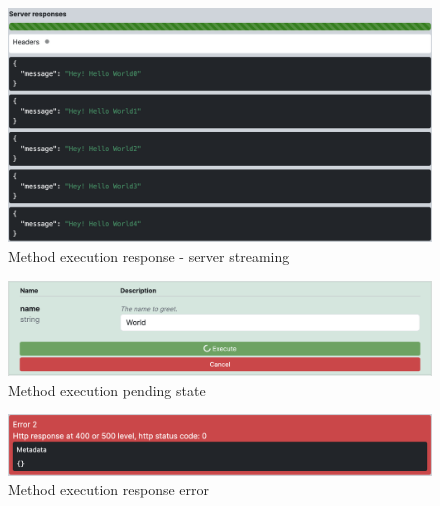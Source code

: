 \begin{figure}[hbt!]
    \centering
    \captionsetup{justification=centering}
    \includegraphics[width=1.0\textwidth]{images/implementation/screenshots/responses-streaming}
    \caption{Method execution response - server streaming}
    \label{fig:implementation-screenshots-responses-streaming}
\end{figure}


\begin{figure}[hbt!]
    \centering
    \captionsetup{justification=centering}
    \includegraphics[width=1.0\textwidth]{images/implementation/screenshots/execution-pending}
    \caption{Method execution pending state}
    \label{fig:implementation-screenshots-execution-pending}
\end{figure}

\begin{figure}[hbt!]
    \centering
    \captionsetup{justification=centering}
    \includegraphics[width=1.0\textwidth]{images/implementation/screenshots/response-error}
    \caption{Method execution response error}
    \label{fig:implementation-screenshots-response-error}
\end{figure}

